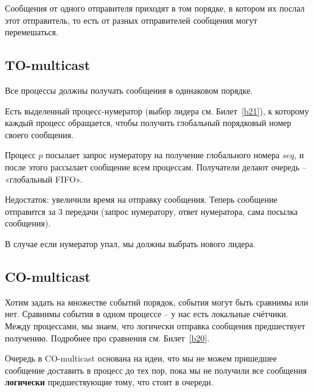 Сообщения от одного отправителя приходят в том порядке, в котором их послал этот отправитель, то есть от разных отправителей сообщения могут перемешаться.



\subsection*{TO-multicast}\label{b19:part4}

Все процессы должны получать сообщения в одинаковом порядке.

Есть выделенный процесс-нумератор (выбор лидера см. Билет~\ref{b21}), к которому каждый процесс обращается, чтобы получить глобальный порядковый номер своего сообщения.

Процесс $p$ посылает запрос нумератору на получение глобального номера $seq$, и после этого рассылает сообщение всем процессам. Получатели делают очередь -- «глобальный FIFO».

Недостаток: увеличили время на отправку сообщения. Теперь сообщение отправится за 3 передачи (запрос нумератору, ответ нумератора, сама посылка сообщения).

В случае если нумератор упал, мы должны выбрать нового лидера.


\subsection*{CO-multicast}\label{b19:part5}

Хотим задать на множестве событий порядок, события могут быть сравнимы или нет. Сравнимы события в одном процессе -- у нас есть локальные счётчики. Между процессами, мы знаем, что логически отправка сообщения предшествует получению. Подробнее про сравнения см. Билет~\ref{b20}.

Очередь в CO-multicast основана на идеи, что мы не можем пришедшее сообщение доставить в процесс до тех пор, пока мы не получили все сообщения \textbf{логически} предшествующие тому, что стоит в очереди.